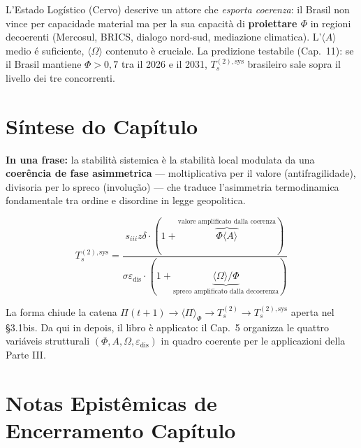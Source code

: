 L'Estado Logístico (Cervo) descrive un attore che \emph{esporta
coerenza}: il Brasil non vince per capacidade material ma per la sua
capacità di \textbf{proiettare \(\Phi\)} in regioni decoerenti
(Mercosul, BRICS, dialogo nord-sud, mediazione climatica).
L'\(\langle A\rangle\) medio é suficiente, \(\langle\Omega\rangle\)
contenuto è cruciale. La predizione testabile (Cap.~11): se il Brasil
mantiene \(\Phi > 0{,}7\) tra il 2026 e il 2031,
\(T_s^{(2),\text{sys}}\) brasileiro sale sopra il livello dei tre
concorrenti.



\section{Síntese do Capítulo}\label{sintesi-del-capítulo}

\Proved{} \textbf{In una frase:} la stabilità sistemica è la stabilità
local modulata da una \textbf{coerência de fase asimmetrica} ---
moltiplicativa per il valore (antifragilidade), divisoria per lo spreco
(involução) --- che traduce l'asimmetria termodinamica fondamentale
tra ordine e disordine in legge geopolitica.

\[
T_s^{(2),\text{sys}} = \frac{s_{iii} z \delta \cdot (1 + \overbrace{\Phi\langle A\rangle}^{\text{valore amplificato dalla coerenza}})}{\sigma \varepsilon_{\text{dis}} \cdot (1 + \underbrace{\langle\Omega\rangle/\Phi}_{\text{spreco amplificato dalla decoerenza}})}
\]

La forma chiude la catena
\(\Pi(t+1) \to \langle\Pi\rangle_\Phi \to T_s^{(2)} \to T_s^{(2),\text{sys}}\)
aperta nel \S{}3.1bis. Da qui in depois, il libro è applicato: il Cap.~5
organizza le quattro variáveis strutturali
\((\Phi, A, \Omega, \varepsilon_{\text{dis}})\) in quadro coerente per
le applicazioni della Parte III.



\section{Notas Epistêmicas de Encerramento
Capítulo}\label{note-epistemiche-di-chiusura-capítulo}


